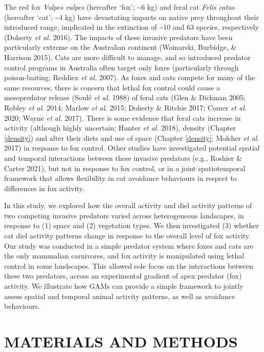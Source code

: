 \documentclass[]{elsarticle} %
\begin{document}
The red fox \emph{Vulpes vulpes} (hereafter `fox'; \textasciitilde6 kg) and feral cat \emph{Felis catus} (hereafter `cat'; \textasciitilde4 kg) have devastating impacts on native prey throughout their introduced range, implicated in the extinction of \textasciitilde10 and 63 species, respectively (Doherty \emph{et al.} 2016). The impacts of these invasive predators have been particularly extreme on the Australian continent (Woinarski, Burbidge, \& Harrison 2015). Cats are more difficult to manage, and so introduced predator control programs in Australia often target only foxes (particularly through poison-baiting; Reddiex \emph{et al.} 2007). As foxes and cats compete for many of the same resources, there is concern that lethal fox control could cause a mesopredator release (Soulé \emph{et al.} 1988) of feral cats (Glen \& Dickman 2005; Robley \emph{et al.} 2014; Marlow \emph{et al.} 2015; Doherty \& Ritchie 2017; Comer \emph{et al.} 2020; Wayne \emph{et al.} 2017). There is some evidence that feral cats increase in activity (although highly uncertain; Hunter \emph{et al.} 2018), density (Chapter \ref{density}) and alter their diets and use of space (Chapter \ref{density}; Molsher \emph{et al.} 2017) in response to fox control. Other studies have investigated potential spatial and temporal interactions between these invasive predators (e.g., Roshier \& Carter 2021), but not in response to fox control, or in a joint spatiotemporal framework that allows flexibility in cat avoidance behaviours in respect to differences in fox activity.

In this study, we explored how the overall activity and diel activity patterns of two competing invasive predators varied across heterogeneous landscapes, in response to (1) space and (2) vegetation types. We then investigated (3) whether cat diel activity patterns change in response to the overall level of fox activity. Our study was conducted in a simple predator system where foxes and cats are the only mammalian carnivores, and fox activity is manipulated using lethal control in some landscapes. This allowed sole focus on the interactions between these two predators, across an experimental gradient of apex predator (fox) activity. We illustrate how GAMs can provide a simple framework to jointly assess spatial and temporal animal activity patterns, as well as avoidance behaviours.

\newpage

\hypertarget{materials-and-methods}{%
\section{MATERIALS AND METHODS}\label{materials-and-methods}}
\end{document}
